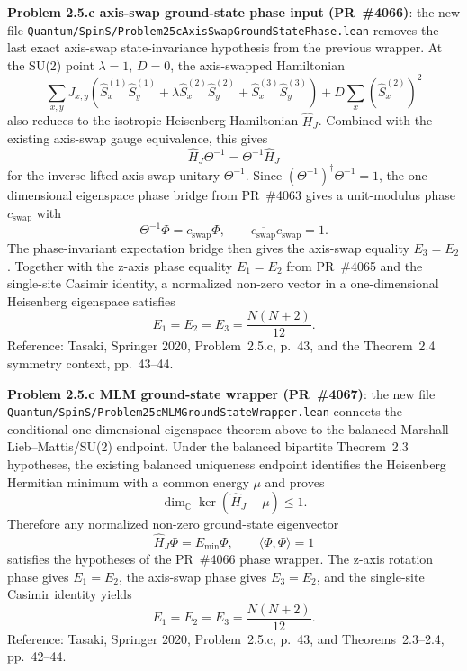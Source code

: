 \documentclass[a4paper,11pt]{article}
\begin{document}
\textbf{Problem 2.5.c axis-swap ground-state phase input (PR~\#4066)}:
the new file
\texttt{Quantum/SpinS/Problem25cAxisSwapGroundStatePhase.lean} removes the
last exact axis-swap state-invariance hypothesis from the previous wrapper.
At the SU(2) point $\lambda=1$, $D=0$, the axis-swapped Hamiltonian
\[
  \sum_{x,y}J_{x,y}\left(\hat S_x^{(1)}\hat S_y^{(1)}
    +\lambda\hat S_x^{(2)}\hat S_y^{(2)}
    +\hat S_x^{(3)}\hat S_y^{(3)}\right)
  +D\sum_x(\hat S_x^{(2)})^2
\]
also reduces to the isotropic Heisenberg Hamiltonian $\hat H_J$.  Combined
with the existing axis-swap gauge equivalence, this gives
\[
  \hat H_J\Theta^{-1}=\Theta^{-1}\hat H_J
\]
for the inverse lifted axis-swap unitary $\Theta^{-1}$.  Since
$(\Theta^{-1})^\dagger\Theta^{-1}=1$, the one-dimensional eigenspace phase
bridge from PR~\#4063 gives a unit-modulus phase $c_{\mathrm{swap}}$ with
\[
  \Theta^{-1}\Phi=c_{\mathrm{swap}}\Phi,\qquad
  \overline{c_{\mathrm{swap}}}c_{\mathrm{swap}}=1.
\]
The phase-invariant expectation bridge then gives the axis-swap equality
$E_3=E_2$.  Together with the z-axis phase equality $E_1=E_2$ from
PR~\#4065 and the single-site Casimir identity, a normalized non-zero vector
in a one-dimensional Heisenberg eigenspace satisfies
\[
  E_1=E_2=E_3=\frac{N(N+2)}{12}.
\]
Reference: Tasaki, Springer 2020, Problem~2.5.c, p.~43, and the
Theorem~2.4 symmetry context, pp.~43--44.

\textbf{Problem 2.5.c MLM ground-state wrapper (PR~\#4067)}:
the new file
\texttt{Quantum/SpinS/Problem25cMLMGroundStateWrapper.lean} connects the
conditional one-dimensional-eigenspace theorem above to the balanced
Marshall--Lieb--Mattis/SU(2) endpoint.  Under the balanced bipartite
Theorem~2.3 hypotheses, the existing balanced uniqueness endpoint identifies
the Heisenberg Hermitian minimum with a common energy $\mu$ and proves
\[
  \dim_{\mathbb C}\ker(\hat H_J-\mu)\le 1.
\]
Therefore any normalized non-zero ground-state eigenvector
\[
  \hat H_J\Phi=E_{\min}\Phi,\qquad \langle\Phi,\Phi\rangle=1
\]
satisfies the hypotheses of the PR~\#4066 phase wrapper.  The z-axis rotation
phase gives $E_1=E_2$, the axis-swap phase gives $E_3=E_2$, and the
single-site Casimir identity yields
\[
  E_1=E_2=E_3=\frac{N(N+2)}{12}.
\]
Reference: Tasaki, Springer 2020, Problem~2.5.c, p.~43, and
Theorems~2.3--2.4, pp.~42--44.
\end{document}
